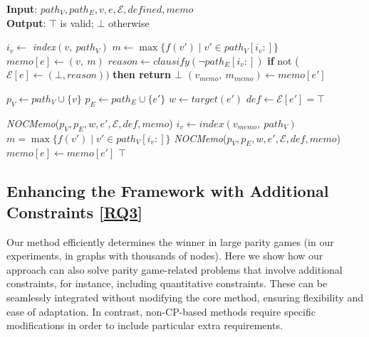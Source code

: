 \documentclass{article}
\begin{document}
\begin{algorithm}
\caption{\textbf{\textit{NOCMemo}}}
\small
\textbf{Input}: $path_V, path_E, v, e, \mathcal{E}, \textit{defined}, \textit{memo}$ \\
\textbf{Output}: $\top$ is valid; $\bot$ otherwise
\begin{algorithmic}[1]
        \STATE $i_v \gets$ \textit{index}$(v,\ path_V)$
        \STATE $m \gets \max\{f(v') \mid v' \in path_V[i_v:]\}$
        \STATE $\textit{memo}[e] \gets (v,\ m)$ \label{alg:noc-memo:update}
            \STATE $\textit{reason} \gets \textit{clausify}(\neg path_E[i_v:])$
            \STATE \textbf{if }not ($\mathcal{E}[e] \gets (\bot, \textit{reason}))$ \textbf{then return $\bot$}
        \ENDIF
            \STATE $(v_{memo},\ m_{memo}) \gets \textit{memo}[e']$

            \STATE $p_V \gets path_V \cup \{v\}$
            \STATE $p_E \gets path_E \cup \{e'\}$
            \STATE $w \gets \textit{target}(e')$
            \STATE $\textit{def} \gets \mathcal{E}[e'] = \top$

                \STATE \textit{NOCMemo}($p_V, p_E, w, e', \mathcal{E}, def , \textit{memo}$)\label{alg:noc-memo:check1}
            \ELSE
                \STATE $i_v \gets \textit{index}(v_{memo},\ path_V)$
                \STATE $m = \max\{f(v') \mid v' \in path_V[i_v:]\}$
                    \STATE \textit{NOCMemo}($p_V, p_E, w, e', \mathcal{E}, def , \textit{memo}$)\label{alg:noc-memo:check2}
                \ELSE
                    \STATE $\textit{memo}[e] \gets \textit{memo}[e']$
                \ENDIF
            \ENDIF
        \ENDFOR
    \ENDIF
    \RETURN $\top$
\end{algorithmic}
\label{alg:noc-memo}
\end{algorithm}

\subsection{Enhancing the Framework with Additional Constraints [\hyperref[sec:rq]{RQ3}]}

Our method efficiently determines the winner in large parity games (in our experiments, in graphs with thousands of nodes). Here we show how our approach can also solve parity game-related problems that involve additional constraints, for instance, including quantitative constraints. These can be seamlessly integrated without modifying the core method, ensuring flexibility and ease of adaptation. In contrast, non-CP-based methods require specific modifications in order to include particular extra requirements.
\end{document}
